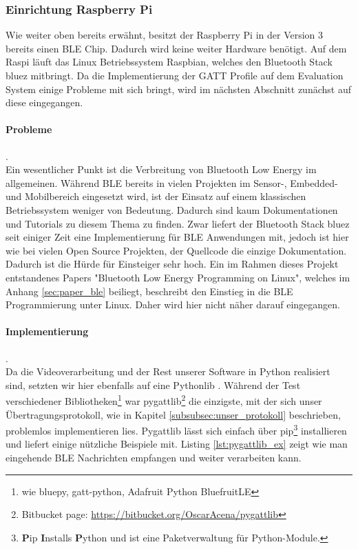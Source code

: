 \subsubsection{Einrichtung Raspberry Pi}
\label{subsubsec:ble_raspi}
Wie weiter oben bereits erwähnt, besitzt der Raspberry Pi in der Version 3 bereits einen BLE Chip. Dadurch wird keine weiter Hardware benötigt. Auf dem Raspi läuft das Linux Betriebssystem Raspbian, welches den Bluetooth Stack bluez mitbringt. Da die Implementierung der GATT Profile auf dem Evaluation System einige Probleme mit sich bringt, wird im nächsten Abschnitt zunächst auf diese eingegangen.

\paragraph{Probleme}. \\ 
Ein wesentlicher Punkt ist die Verbreitung von Bluetooth Low Energy im allgemeinen. Während BLE bereits in vielen Projekten im Sensor-, Embedded- und Mobilbereich eingesetzt wird, ist der Einsatz auf einem klassischen Betriebssystem weniger von Bedeutung. Dadurch sind kaum Dokumentationen und Tutorials zu diesem Thema zu finden. Zwar liefert der Bluetooth Stack bluez seit einiger Zeit eine Implementierung für BLE Anwendungen mit, jedoch ist hier wie bei vielen Open Source Projekten, der Quellcode die einzige Dokumentation. Dadurch ist die Hürde für Einsteiger sehr hoch. Ein im Rahmen dieses Projekt entstandenes Papers "Bluetooth Low Energy Programming on Linux", welches im Anhang \ref{sec:paper_ble} beiliegt, beschreibt den Einstieg in die BLE Programmierung unter Linux. Daher wird hier nicht näher darauf eingegangen. 

\paragraph{Implementierung}. \\
Da die Videoverarbeitung und der Rest unserer Software in Python realisiert sind, setzten wir hier ebenfalls auf eine Pythonlib . Während der Test verschiedener Bibliotheken\footnote{wie bluepy, gatt-python, Adafruit Python BluefruitLE} war pygattlib\footnote{Bitbucket page: \url{https://bitbucket.org/OscarAcena/pygattlib}} die einzigste, mit der sich unser Übertragungsprotokoll, wie in Kapitel \ref{subsubsec:unser_protokoll} beschrieben, problemlos implementieren lies. Pygattlib lässt sich einfach über pip\footnote{ \textbf{P}ip \textbf{I}nstalls \textbf{P}ython und ist eine Paketverwaltung für Python-Module. } installieren und liefert einige nützliche Beispiele mit. Listing \ref{lst:pygattlib_ex} zeigt wie man eingehende BLE Nachrichten empfangen und weiter verarbeiten kann. 


